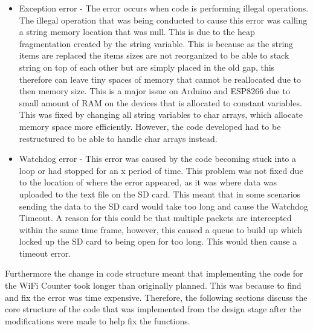 \documentclass{report}
\begin{document}
\begin{itemize}
    \item Exception error - The error occurs when code is performing illegal operations. The illegal operation that was being conducted to cause this error was calling a string memory location that was null. This is due to the heap fragmentation created by the string variable. This is because as the string items are replaced the items sizes are not reorganized to be able to stack string on top of each other but are simply placed in the old gap, this therefore can leave tiny spaces of memory that cannot be reallocated due to then memory size\cite{String}. This is a major issue on Arduino and ESP8266 due to small amount of RAM on the devices that is allocated to constant variables. This was fixed by changing all string variables to char arrays, which allocate memory space more efficiently. However, the code developed had to be restructured to be able to handle char arrays instead.
    \item Watchdog error - This error was caused by the code becoming stuck into a loop or had stopped for an x period of time. This problem was not fixed due to the location of where the error appeared, as it was where data was uploaded to the text file on the SD card. This meant that in some scenarios sending the data to the SD card would take too long and cause the Watchdog Timeout. A reason for this could be that multiple packets are intercepted within the same time frame, however, this caused a queue to build up which locked up the SD card to being open for too long. This would then cause a timeout error.   
\end{itemize}
Furthermore the change in code structure meant that implementing the code for the WiFi Counter took longer than originally planned. This was because to find and fix the error was time expensive. Therefore, the following sections discuss the core structure of the code that was implemented from the design stage after the modifications were made to help fix the functions. 
\end{document}
